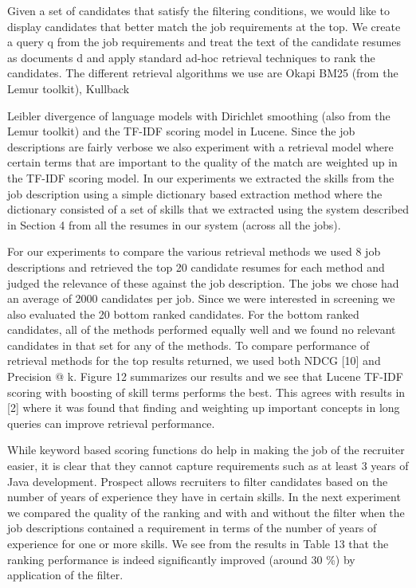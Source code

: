 Given a set of candidates that satisfy the filtering conditions, we would like to display candidates that better match
the job requirements at the top. We create a query q from the job requirements and treat the text of the candidate resumes as documents d and apply standard ad-hoc retrieval techniques to rank the candidates. The different retrieval algorithms we use are Okapi BM25 (from the Lemur toolkit), Kullback{Leibler divergence of language models with Dirichlet smoothing (also from the Lemur toolkit) and the TF-IDF scoring model in Lucene. Since the job descriptions are fairly verbose we also experiment with a retrieval model where certain terms that are important to the quality of the match are weighted up in the TF-IDF scoring model. In our experiments we extracted the skills from the job description using a simple dictionary based extraction method where the dictionary consisted of a set of skills that we extracted using the system described in Section 4 from all the resumes in our system (across all the jobs).

For our experiments to compare the various retrieval methods we used 8 job descriptions and retrieved the top 20 candidate resumes for each method and judged the relevance of these against the job description. The jobs we chose had an
average of 2000 candidates per job. Since we were interested in screening we also evaluated the 20 bottom ranked candidates. For the bottom ranked candidates, all of the methods performed equally well and we found no relevant candidates
in that set for any of the methods. To compare performance of retrieval methods for the top results returned, we used
both NDCG [10] and Precision @ k. Figure 12 summarizes our results and we see that Lucene TF-IDF scoring with
boosting of skill terms performs the best. This agrees with results in [2] where it was found that finding and weighting
up important concepts in long queries can improve retrieval performance.

While keyword based scoring functions do help in making the job of the recruiter easier, it is clear that they cannot
capture requirements such as at least 3 years of Java development. Prospect allows recruiters to filter candidates
based on the number of years of experience they have in certain skills. In the next experiment we compared the quality
of the ranking and with and without the filter when the job descriptions contained a requirement in terms of the number
of years of experience for one or more skills. We see from the results in Table 13 that the ranking performance is indeed
significantly improved (around 30 \%) by application of the filter.

}

